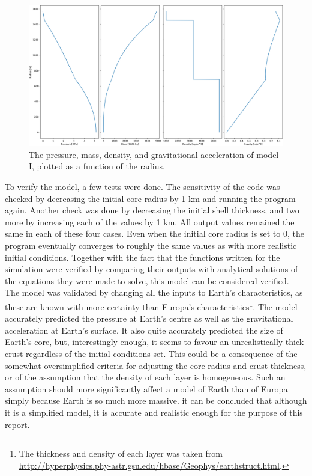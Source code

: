 \documentclass[twocolumn]{article}
\begin{document}
\begin{figure}[h]
	\centering
	\includegraphics[width=\columnwidth]{profile1.png}
	\caption{The pressure, mass, density, and gravitational acceleration of model I, plotted as a function of the radius.}
	\label{fig:profile1}
\end{figure}
To verify the model, a few tests were done. The sensitivity of the code was checked by decreasing the initial core radius by 1 km and running the program again. Another check was done by decreasing the initial shell thickness, and two more by increasing each of the values by 1 km. All output values remained the same in each of these four cases. Even when the initial core radius is set to 0, the program eventually converges to roughly the same values as with more realistic initial conditions. Together with the fact that the functions written for the simulation were verified by comparing their outputs with analytical solutions of the equations they were made to solve, this model can be considered verified.\\
The model was validated by changing all the inputs to Earth's characteristics, as these are known with more certainty than Europa's characteristics\footnote{The thickness and density of each layer was taken from \url{http://hyperphysics.phy-astr.gsu.edu/hbase/Geophys/earthstruct.html}.}. The model accurately predicted the pressure at Earth's centre as well as the gravitational acceleration at Earth's surface. It also quite accurately predicted the size of Earth's core, but, interestingly enough, it seems to favour an unrealistically thick crust regardless of the initial conditions set. This could be a consequence of the somewhat oversimplified criteria for adjusting the core radius and crust thickness, or of the assumption that the density of each layer is homogeneous. Such an assumption should more significantly affect a model of Earth than of Europa simply because Earth is so much more massive. it can be concluded that although it is a simplified model, it is accurate and realistic enough for the purpose of this report.
\end{document}
